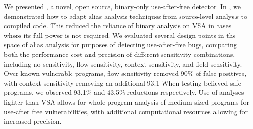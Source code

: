 We presented \aliasname, a novel, open source, binary-only use-after-free detector.
In \aliasname, we demonstrated how to adapt alias analysis techniques from source-level analysis to compiled code.
This reduced the reliance of binary analysis on VSA in cases where its full power is not required.
We evaluated several design points in the space of alias analysis for purposes of detecting use-after-free bugs, comparing both the performance cost and precision of different sensitivity combinations, including no sensitivity, flow sensitivity, context sensitivity, and field sensitivity.
Over known-vulnerable programs, flow sensitivity removed 90\% of false positives, with context sensitivity removing an additional 93.1%
When testing believed safe programs, we observed 93.1\% and 43.5\% reductions respectively.
Use of analyses lighter than VSA allows for whole program analysis of medium-sized programs for use-after free vulnerabilities, with additional computational resources allowing for increased precision.
